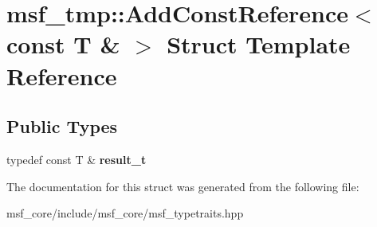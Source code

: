 \hypertarget{structmsf__tmp_1_1AddConstReference_3_01const_01T_01_6_01_4}{\section{msf\-\_\-tmp\-:\-:Add\-Const\-Reference$<$ const T \& $>$ Struct Template Reference}
\label{structmsf__tmp_1_1AddConstReference_3_01const_01T_01_6_01_4}
}
\subsection*{Public Types}
\begin{DoxyCompactItemize}
\item 
\hypertarget{structmsf__tmp_1_1AddConstReference_3_01const_01T_01_6_01_4_ae1c3b92a3c461c4072590a2389bb272a}{typedef const T \& {\bfseries result\-\_\-t}}\label{structmsf__tmp_1_1AddConstReference_3_01const_01T_01_6_01_4_ae1c3b92a3c461c4072590a2389bb272a}

\end{DoxyCompactItemize}


The documentation for this struct was generated from the following file\-:\begin{DoxyCompactItemize}
\item 
msf\-\_\-core/include/msf\-\_\-core/msf\-\_\-typetraits.\-hpp\end{DoxyCompactItemize}
